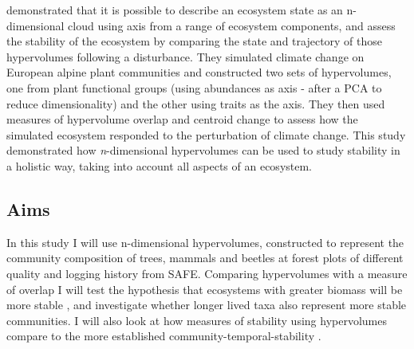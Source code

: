  
\cite{Barros2016} demonstrated that it is possible to describe an ecosystem state as an n-dimensional cloud using axis from a range of ecosystem components, and assess the stability of the ecosystem by comparing the state and trajectory of those hypervolumes following a disturbance. They simulated climate change on European alpine plant communities and constructed two sets of hypervolumes, one from plant functional groups (using abundances as axis - after a PCA to reduce dimensionality) and the other using traits as the axis. They then used measures of hypervolume overlap and centroid change to assess how the simulated ecosystem responded to the perturbation of climate change. This study demonstrated how \emph{n}-dimensional hypervolumes can be used to study stability in a holistic way, taking into account all aspects of an ecosystem.


\subsection{Aims}

In this study I will use n-dimensional hypervolumes, constructed to represent the community composition of trees, mammals and beetles at forest plots of different quality and logging history from SAFE. Comparing hypervolumes with a measure of overlap I will test the hypothesis that ecosystems with greater biomass will be more stable \citep{Tilman2006}, and investigate whether longer lived taxa also represent more stable communities. I will also look at how measures of stability using hypervolumes compare to the more established community-temporal-stability \citep{Lehman2000}.
 	